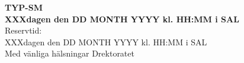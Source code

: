 \documentclass[a4paper,12pt]{article}
\begin{document}
\vspace*{\fill}
\begin{center}
{\Huge \bf TYP-SM}\\ %
{\LARGE \bf XXXdagen den DD MONTH YYYY kl. HH:MM i SAL}\\
{\Large Reservtid:}\\
{\Large XXXdagen den DD MONTH YYYY kl. HH:MM i SAL}\\

\vspace{1in}
{\LARGE Med vänliga hälsningar Drektoratet}
\end{center}
\vspace*{\fill}
\end{document}
